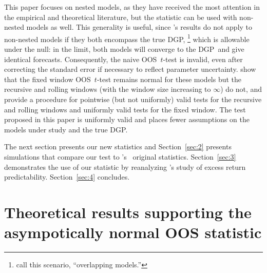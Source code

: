 \documentclass[12pt,fleqn]{article}
\newcommand\citepos[2][]{\citeauthor{#2}'s \citeyearpar[#1]{#2}}
\newcommand\poscw{\citeauthor{ClW:06}'s \citeyearpar{ClW:06,ClW:07}}
\theoremstyle{definition}
\newcommand{\dgp}{DGP}
\newcommand{\oos}{OOS}
\begin{document}
This paper focuses on nested models, as they have received the most
attention in the empirical and theoretical literature, but the
statistic can be used with non-nested models as well.  This generality
is useful, since \citepos{Wes:96} results do not apply to non-nested
models if they both encompass the true \dgp,%
\footnote{\citet{ClM:11b}
  call this scenario, ``overlapping models.''} %
which is allowable
under the null: in the limit, both models will converge to the \dgp\
and give identical forecasts.  Consequently, the naive \oos\ $t$-test
is invalid, even after correcting the standard error if necessary to
reflect parameter uncertainty.  \citet{ClM:11b} show that the fixed
window \oos\ $t$-test remains normal for these models but the
recursive and rolling windows (with the window size increasing to
$\infty$) do not, and provide a procedure for pointwise (but not
uniformly) valid tests for the recursive and rolling windows and
uniformly valid tests for the fixed window.  The test proposed in this
paper is uniformly valid and places fewer assumptions on the models
under study and the true \dgp.

The next section presents our new statistics and Section~\ref{sec:2} presents
simulations that compare our test to \poscw\ original
statistics.  Section~\ref{sec:3} demonstrates the use of our statistic
by reanalyzing \citepos{GoW:08} study of excess return
predictability. Section~\ref{sec:4} concludes.

\section{Theoretical results supporting the asympotically normal OOS statistic}
\label{sec:1}
\end{document}
